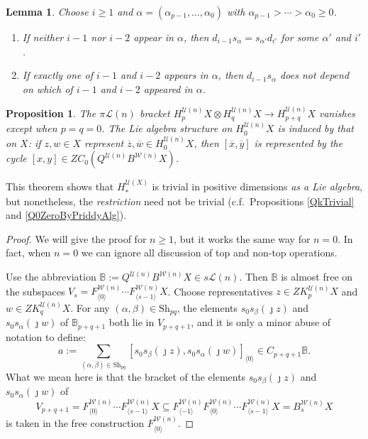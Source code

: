 \documentclass[11pt]{amsart} \renewcommand{\baselinestretch}{1.2}
\theoremstyle{plain}
\newtheorem{lem}[thm]{Lemma}
\newtheorem{prop}[thm]{Proposition}
\numberwithin{equation}{section} %
\theoremstyle{plain}
\newtheorem{lem}[thm]{Lemma}
\newtheorem{prop}[thm]{Proposition}
\numberwithin{equation}{chapter} %
\renewcommand{\to}{\longrightarrow}
\newcommand{\squishlist}{
}
\newcommand{\calU}{\mathcal{U}}
\newcommand{\calL}{\mathcal{L}}
\newcommand{\calw}{\mathcal{W}}
\newcommand{\PA}[1]{\pi#1}
\newcommand{\Shuffles}[2]{\mathrm{Sh}_{#1#2}}
\begin{document}
\begin{Koszul complexes}
\begin{lem}
\label{LemmaOnSimplicialRelations}
Choose $i\geq1$ and $\alpha=(\alpha_{p-1},\ldots,\alpha_0)$ with $\alpha_{p-1}>\cdots >\alpha_0\geq0$.
\begin{enumerate}\squishlist
\item \label{LemmaOnSimplicialRelationsi} If neither $i-1$ nor $i-2$ appear in $\alpha$, then  $d_{i-1}s_\alpha=s_{\alpha'}d_{i'}$ for some $\alpha'$ and $i'$.
\item \label{LemmaOnSimplicialRelationsii} If exactly one of $i-1$ and $i-2$ appears in $\alpha$, then  $d_{i-1}s_\alpha$ does not depend on which of $i-1$ and $i-2$ appeared in $\alpha$.
\end{enumerate}
\end{lem}

\begin{prop}
\label{LieBracketsTrivial}
The $\PA{\calL(n)}$ bracket $H_p^{\calU(n)}X\otimes H_q^{\calU(n)}X\to H_{p+q}^{\calU(n)}X$ vanishes except when $p=q=0$. 
The Lie algebra structure on $H_0^{\calU(n)}X$ is induced by that on $X$: if $z,w\in X$ represent $\overline{z},\overline{w}\in H_0^{\calU(n)}X$, then $[\overline{x},\overline{y}]$ is represented by the cycle $[x,y]\in ZC_0(Q^{\calU(n)}B^{\calw(n)}X)$.
\end{prop}
\noindent This theorem shows that $H_*^{\calU(X)}$ is trivial in positive dimensions \emph{as a Lie algebra}, but nonetheless, the \emph{restriction} need not be trivial (c.f.\ Propositions \ref{QkTrivial} and \ref{Q0ZeroByPriddyAlg}).
\begin{proof}
We will give the proof for $n\geq1$, but it works the same way for $n=0$. In fact, when $n=0$ we can ignore all discussion of top and non-top operations.

Use the abbreviation $\mathbb{B}:=Q^{\calU(n)}B^{\calw(n)}X\in s\calL(n)$. Then $\mathbb{B}$ is almost free on the subspaces $V_s=F^{\calw(n)}_{\langle 0\rangle}\cdots F^{\calw(n)}_{\langle s-1\rangle}X$. Choose representatives $z\in ZK_p^{\calU(n)}X$ and $w\in ZK_q^{\calU(n)}X$. For any $(\alpha,\beta)\in\Shuffles{p}{q}$, the elements $s_{0}s_\beta(\jmath z)$ and $s_{0}s_\alpha(\jmath w)$ of $\mathbb{B}_{p+q+1}$ both lie in $V_{p+q+1}$, and it is only a minor abuse of notation to define:
\[a:=\sum_{(\alpha,\beta)\in\Shuffles{p}{q}}[s_{0}s_\beta(\jmath z), s_{0}s_\alpha(\jmath w)]_{\langle 0\rangle}\in C_{p+q+1}\mathbb{B}.\]
What we mean here is that the bracket of the elements $s_{0}s_\beta(\jmath z)$ and $s_{0}s_\alpha(\jmath w)$ of
\[ V_{p+q+1}=F^{\calw(n)}_{\langle 0\rangle}\cdots F^{\calw(n)}_{\langle s-1\rangle}X\subseteq F^{\calw(n)}_{\langle -1\rangle}F^{\calw(n)}_{\langle 0\rangle}\cdots F^{\calw(n)}_{\langle s-1\rangle}X=B^{\calw(n)}_{s}X\]
is taken in the free construction $F^{\calw(n)}_{\langle 0\rangle}$.


\end{proof}
\end{Koszul complexes}
\end{document}
